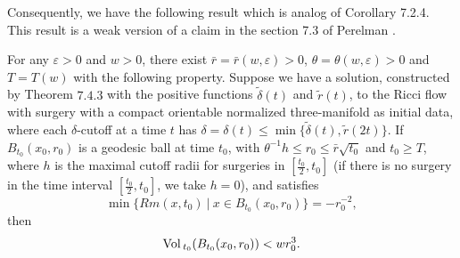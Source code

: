 Consequently, we have the following result which is analog of
Corollary 7.2.4. This result is a weak version of a claim in the
section 7.3 of {Perelman \cite{P2}}.

\begin{corollary}
  \label{cor:cz-large-time-local-volume-canonical-neighborhoods}

For any $\varepsilon > 0$ and $w>0$, there exist
$\bar{r}=\bar{r}(w,\varepsilon)>0$,
$\theta=\theta(w,\varepsilon)>0$ and $T=T(w)$ with the following
property. Suppose we have a solution, constructed by Theorem
$7.4.3$ with the positive functions $\widetilde{\delta}(t)$ and
$\widetilde{r}(t)$, to the Ricci flow with surgery with a compact
orientable normalized three-manifold as initial data, where each
$\delta$-cutoff at a time $t$ has $\delta=\delta(t)\leq
\min\{\widetilde{\delta}(t), \widetilde{r}(2t)\}$. If
$B_{t_0}(x_0,r_0)$ is a geodesic ball at time $t_0$, with
$\theta^{-1}h\leq r_0\leq \bar{r}\sqrt{t_0}$ and $t_0 \geq T$,
where $h$ is the maximal cutoff radii for surgeries in
$[\frac{t_0}{2},t_0]$ (if there is no surgery in the time interval
$[\frac{t_0}{2},t_0]$, we take $h=0$), and satisfies
$$
\min\{Rm(x,t_0)\ |\ x\in B_{t_0}(x_0,r_0)\}=-r^{-2}_0,
$$
then
$$
{\rm Vol}\,_{t_0}(B_{t_0}(x_0,r_0))<w r^3_0.
$$
\end{corollary}

